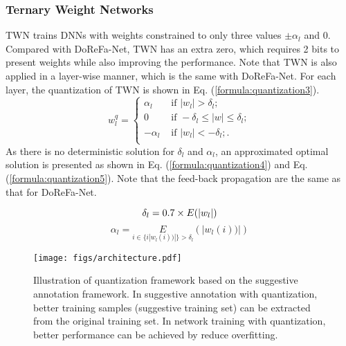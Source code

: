 \documentclass[10pt,twocolumn,letterpaper]{article}
\begin{document}
\subsubsection{Ternary Weight Networks}
TWN \cite{li2016ternary} trains DNNs with weights constrained to only three values $\pm\alpha_l$ and 0.
Compared with DoReFa-Net, TWN has an extra zero, which requires 2 bits to present weights while also improving the performance.
Note that TWN is also applied in a layer-wise manner, which is the same with DoReFa-Net.
For each layer, the quantization of TWN is shown in Eq. (\ref{formula:quantization3}).
\begin{equation}\label{formula:quantization3}
w_l^q=\begin{cases}
\alpha_l    & \text{ if } |w_l|>\delta_l; \\
0           & \text{ if } -\delta_l \leq |w| \leq \delta_l; \\
-\alpha_l   & \text{ if } |w_l|<-\delta_l;.\\
\end{cases}
\end{equation}
As there is no deterministic solution for $\delta_l$ and $\alpha_l$, an approximated optimal solution is presented as shown in Eq. (\ref{formula:quantization4}) and Eq. (\ref{formula:quantization5}).
Note that the feed-back propagation are the same as that for DoReFa-Net.

\begin{equation}\label{formula:quantization4}
\delta_l=0.7\times E(|w_l|) \\
\end{equation}
\begin{equation}\label{formula:quantization5}
\alpha_l = \underset{i\in \{ i |w_l(i))|\}>\delta_l }{E}(|w_l(i))|)
\end{equation}

\begin{figure*}[!htbp]
\begin{center}
\centerline{\texttt{[image: figs/architecture.pdf]}}
\end{center}
\vspace{-20pt}
   \caption{Illustration of quantization framework based on the suggestive annotation framework. In suggestive annotation with quantization, better training samples (suggestive training set) can be extracted from the original training set. In network training with quantization, better performance can be achieved by reduce overfitting. }
\label{fig:architecture}
\vspace{-10pt}
\end{figure*}
\end{document}
